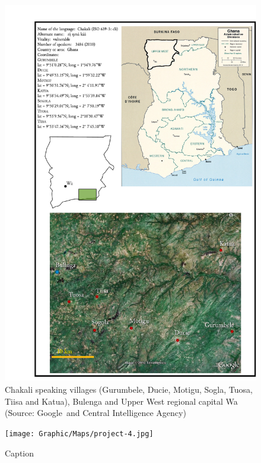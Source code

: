 \begin{figure}[htp]
\centering
\includegraphics[clip=true, trim= 20mm 0mm 0mm 10mm, 
height=6.6in]{Graphic/Maps/climapII.pdf}

\caption[Chakali speaking area]{Chakali
speaking villages (Gurumbele,
Ducie, Motigu, Sogla, Tuosa, Tiisa and  Katua), Bulenga and Upper West
 regional capital Wa (Source: Google\texttrademark \   and Central Intelligence
Agency) \label{fig:INT-cliland}}
\end{figure}

\begin{figure}
 \centering

\texttt{[image: Graphic/Maps/project-4.jpg]}

\caption[]{Caption\label{fig:}}
\end{figure}


 

